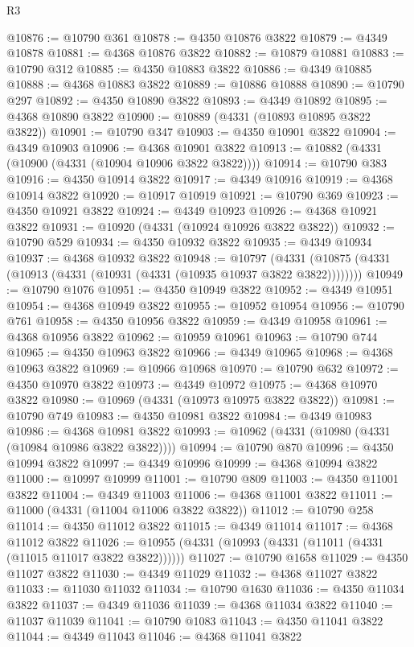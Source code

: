 \begin{lexlean}{R3}
\begin{coremodule}
@10876 := @10790 @361
@10878 := @4350 @10876 @3822
@10879 := @4349 @10878
@10881 := @4368 @10876 @3822
@10882 := @10879 @10881
@10883 := @10790 @312
@10885 := @4350 @10883 @3822
@10886 := @4349 @10885
@10888 := @4368 @10883 @3822
@10889 := @10886 @10888
@10890 := @10790 @297
@10892 := @4350 @10890 @3822
@10893 := @4349 @10892
@10895 := @4368 @10890 @3822
@10900 := @10889 (@4331 (@10893 @10895 @3822 @3822))
@10901 := @10790 @347
@10903 := @4350 @10901 @3822
@10904 := @4349 @10903
@10906 := @4368 @10901 @3822
@10913 := @10882 (@4331 (@10900 (@4331 (@10904 @10906 @3822 @3822))))
@10914 := @10790 @383
@10916 := @4350 @10914 @3822
@10917 := @4349 @10916
@10919 := @4368 @10914 @3822
@10920 := @10917 @10919
@10921 := @10790 @369
@10923 := @4350 @10921 @3822
@10924 := @4349 @10923
@10926 := @4368 @10921 @3822
@10931 := @10920 (@4331 (@10924 @10926 @3822 @3822))
@10932 := @10790 @529
@10934 := @4350 @10932 @3822
@10935 := @4349 @10934
@10937 := @4368 @10932 @3822
@10948 := @10797
    (@4331 (@10875 (@4331 (@10913 (@4331 (@10931 (@4331 (@10935 @10937 @3822 @3822))))))))
@10949 := @10790 @1076
@10951 := @4350 @10949 @3822
@10952 := @4349 @10951
@10954 := @4368 @10949 @3822
@10955 := @10952 @10954
@10956 := @10790 @761
@10958 := @4350 @10956 @3822
@10959 := @4349 @10958
@10961 := @4368 @10956 @3822
@10962 := @10959 @10961
@10963 := @10790 @744
@10965 := @4350 @10963 @3822
@10966 := @4349 @10965
@10968 := @4368 @10963 @3822
@10969 := @10966 @10968
@10970 := @10790 @632
@10972 := @4350 @10970 @3822
@10973 := @4349 @10972
@10975 := @4368 @10970 @3822
@10980 := @10969 (@4331 (@10973 @10975 @3822 @3822))
@10981 := @10790 @749
@10983 := @4350 @10981 @3822
@10984 := @4349 @10983
@10986 := @4368 @10981 @3822
@10993 := @10962 (@4331 (@10980 (@4331 (@10984 @10986 @3822 @3822))))
@10994 := @10790 @870
@10996 := @4350 @10994 @3822
@10997 := @4349 @10996
@10999 := @4368 @10994 @3822
@11000 := @10997 @10999
@11001 := @10790 @809
@11003 := @4350 @11001 @3822
@11004 := @4349 @11003
@11006 := @4368 @11001 @3822
@11011 := @11000 (@4331 (@11004 @11006 @3822 @3822))
@11012 := @10790 @258
@11014 := @4350 @11012 @3822
@11015 := @4349 @11014
@11017 := @4368 @11012 @3822
@11026 := @10955 (@4331 (@10993 (@4331 (@11011 (@4331 (@11015 @11017 @3822 @3822))))))
@11027 := @10790 @1658
@11029 := @4350 @11027 @3822
@11030 := @4349 @11029
@11032 := @4368 @11027 @3822
@11033 := @11030 @11032
@11034 := @10790 @1630
@11036 := @4350 @11034 @3822
@11037 := @4349 @11036
@11039 := @4368 @11034 @3822
@11040 := @11037 @11039
@11041 := @10790 @1083
@11043 := @4350 @11041 @3822
@11044 := @4349 @11043
@11046 := @4368 @11041 @3822

\end{coremodule}
\end{lexlean}
